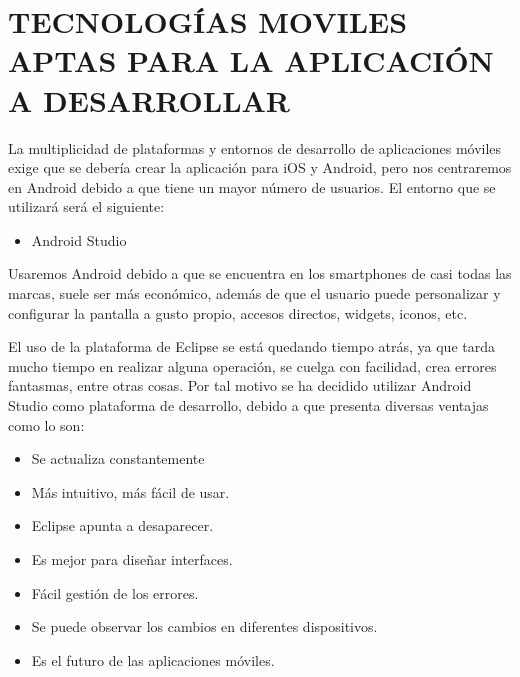 \section{TECNOLOGÍAS MOVILES APTAS PARA LA APLICACIÓN A DESARROLLAR}
La multiplicidad de plataformas y entornos de desarrollo de aplicaciones móviles exige que se debería crear la aplicación para iOS y Android, pero nos centraremos en Android debido a que tiene un mayor número de usuarios. El entorno que se utilizará será el siguiente:
\begin{itemize}
    \item Android Studio
\end{itemize} \par
Usaremos Android debido a que se encuentra en los smartphones de casi todas las marcas, suele ser más económico, además de que el usuario puede personalizar y configurar la pantalla a gusto propio, accesos directos, widgets, iconos, etc. \par
El uso de la plataforma de Eclipse se está quedando tiempo atrás, ya que tarda mucho tiempo en realizar alguna operación, se cuelga con facilidad, crea errores fantasmas, entre otras cosas. Por tal motivo se ha decidido utilizar Android Studio como plataforma de desarrollo, debido a que presenta diversas ventajas como lo son:
\begin{itemize}
    \item Se actualiza constantemente
    \item Más intuitivo, más fácil de usar.
    \item Eclipse apunta a desaparecer.
    \item Es mejor para diseñar interfaces.
    \item Fácil gestión de los errores.
    \item Se puede observar los cambios en diferentes dispositivos.
    \item Es el futuro de las aplicaciones móviles.
\end{itemize}